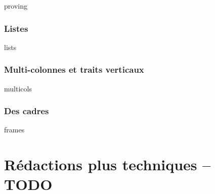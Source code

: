 \documentclass[12pt]{memoir}
\begin{document}
{proving}




\section{Listes}

{lists}




\section{Multi-colonnes et traits verticaux}

{multicols}




\section{Des cadres}

{frames}




\part{Rédactions plus techniques -- TODO}

%
%
%
%
%
%
%
%
%
%
%
%
%
%
%
%
%
\end{document}
